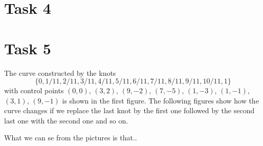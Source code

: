 \documentclass[]{article}
\begin{document}
\section*{Task 4}


\section*{Task 5}
The curve constructed by the knots $$\{0,1/11,2/11,3/11,4/11,5/11,6/11,7/11,8/11,9/11,10/11,1\}$$ with control points $(0,0)$, $(3,2)$, $(9,-2)$, $(7,-5)$, $(1,-3)$, $(1,-1)$, $(3,1)$, $(9,-1)$ is shown in the first figure. The following figures show how the curve changes if we replace the last knot by the first one followed by the second last one with the second one and so on. 

What we can se from the pictures is that..

\begin{figure}[h!]
\end{figure}
\end{document}
